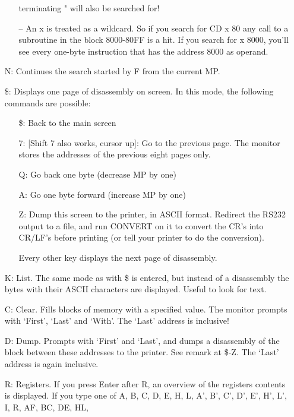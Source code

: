 \begin{itemize}
\begin{itemize}
             terminating " will also be searched for!
    \item[--] An x is treated as a wildcard.  So if you search for CD x 80
             any call to a subroutine in the block 8000-80FF is a hit.
             If you search for x 8000, you'll see every one-byte
             instruction that has the address 8000 as operand.
  \end{itemize}
  \item[N:] Continues the search started by F from the current MP.
  \item[\$:] Displays one page of disassembly on screen.  In this mode,
             the following commands are possible:
  \begin{itemize}
    \item[\$:] Back to the main screen
    \item[7:] [Shift 7 also works, cursor up]: Go to the previous page.
              The monitor stores the addresses of the previous eight
              pages only.
    \item[Q:] Go back one byte (decrease MP by one)
    \item[A:] Go one byte forward (increase MP by one)
    \item[Z:] Dump this screen to the printer, in ASCII format.  Redirect
              the RS232 output to a file, and run CONVERT on it to convert
              the CR's into CR/LF's before printing (or tell your printer
              to do the conversion).
    \item[] Every other key displays the next page of disassembly.
  \end{itemize}
  \item[K:] List.  The same mode as with \$ is entered, but instead of a
           disassembly the bytes with their ASCII characters are
           displayed.  Useful to look for text.
  \item[C:] Clear.  Fills blocks of memory with a specified value.  The
           monitor prompts with `First', `Last' and `With'.  The `Last'
           address is inclusive!
  \item[D:] Dump.  Prompts with `First' and `Last', and dumps a
           disassembly of the block between these addresses to the
           printer.  See remark at \$-Z.  The `Last' address is again
           inclusive.
  \item[R:] Registers.  If you press Enter after R, an overview of the
           registers contents is displayed.  If you type one of A, B, C,
	   D, E, H, L, A', B', C', D', E', H', L', I, R, AF, BC, DE, HL,

\end{itemize}
